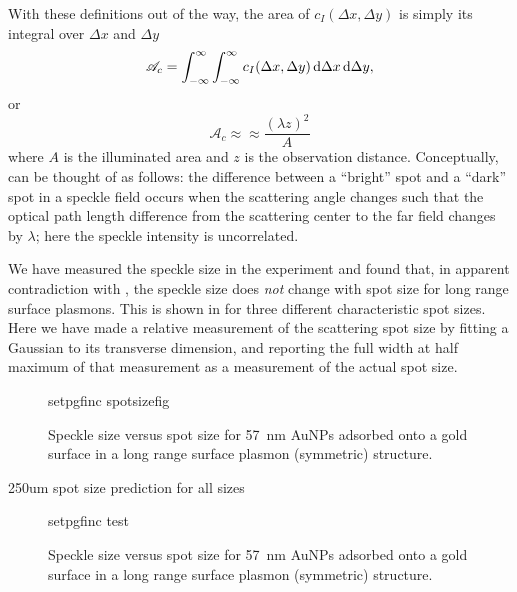 With these definitions out of the way, the area of $c_I(\Delta x, \Delta
y)$ is simply its integral over $\Delta x$ and $\Delta y$
\begin{equation}
\mathscr{A}_c = \int_{-\infty}^{\infty}\int_{-\infty}^{\infty} c_I(\Delta x, \Delta y) \,\mathrm{d} \Delta x \,\mathrm{d}
\Delta y,
\label{eqn:spotsize1}
\end{equation}
or
\begin{equation}
\mathscr{A}_c \approx \approx\frac{{(\lambda z)}^2}{A}
\label{eqn:spotsize2}
\end{equation}
where $A$ is the illuminated area and $z$ is the observation distance.
Conceptually,  can be thought of as follows: the
difference between a ``bright'' spot and a ``dark'' spot in a speckle field
occurs when the scattering angle changes such that the optical path length
difference from the scattering center to the far field changes by
$\lambda$; here the speckle intensity is uncorrelated.

We have measured the speckle size in the experiment and found that, in
apparent contradiction with , the speckle size does
\textit{not} change with spot size for long range surface plasmons.  This
is shown in  for three different characteristic spot
sizes.  Here we have made a relative measurement of the scattering spot
size by fitting a Gaussian to its transverse dimension, and reporting the
full width at half maximum of that measurement as a measurement of the
actual spot size.
\begin{figure}[ht]
\centering
{setpgfinc}
{spotsizefig}
\caption{Speckle size versus spot size for \SI{57}{\nano\meter} AuNPs adsorbed
onto a gold surface in a long range surface plasmon (symmetric) structure.}
\label{fig:spotsize}
\end{figure}
250um spot size prediction for all sizes

\begin{figure}[ht]
\centering
{setpgfinc}
{test}
\caption{Speckle size versus spot size for \SI{57}{\nano\meter} AuNPs adsorbed
onto a gold surface in a long range surface plasmon (symmetric) structure.}
\label{fig:spotsizewspeckle}
\end{figure}


